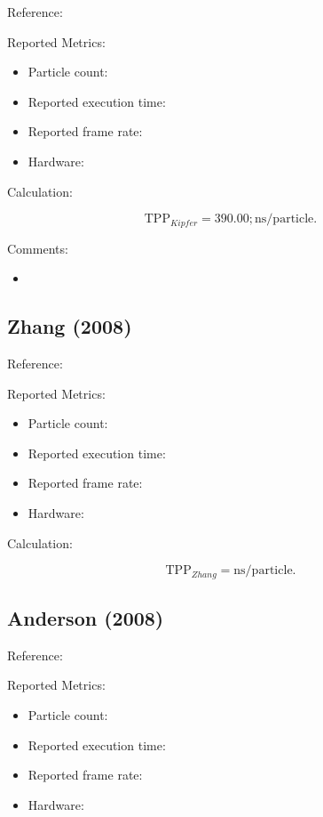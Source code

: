 Reference:
\cite{kipfer}

Reported Metrics:

\begin{itemize}
\item Particle count:
\item Reported execution time:
\item Reported frame rate:
\item Hardware:
\end{itemize}

Calculation:

\begin{equation}
\mathrm{TPP}_{Kipfer}=390.00;\mathrm{ns/particle}.
\end{equation}

Comments:

\begin{itemize}
\item
\end{itemize}

\subsection{Zhang (2008)}

Reference:
\cite{zhang}

Reported Metrics:

\begin{itemize}
\item Particle count:
\item Reported execution time:
\item Reported frame rate:
\item Hardware:
\end{itemize}

Calculation:

\begin{equation}
\mathrm{TPP}_{Zhang}=\mathrm{ns/particle}.
\end{equation}

\subsection{Anderson (2008)}

Reference:
\cite{anderson}

Reported Metrics:

\begin{itemize}
\item Particle count:
\item Reported execution time:
\item Reported frame rate:
\item Hardware:
\end{itemize}


